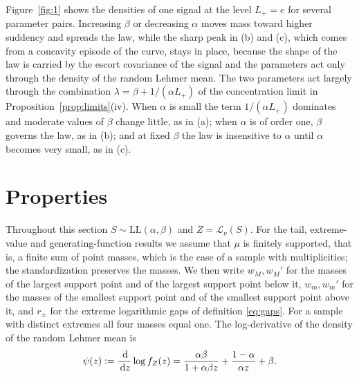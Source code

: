\documentclass[sn-mathphys-num]{sn-jnl}\newcommand{\SNJNL}{}
\theoremstyle{thmstyleone}
\theoremstyle{thmstyletwo}
\theoremstyle{thmstylethree}
\theoremstyle{thmstyleone}
\providecommand{\Leh}{\mathscr{L}}
\providecommand{\dd}{\,\mathrm{d}}
\providecommand{\eqdef}{\mathrel{\vcentcolon=}}
\providecommand{\LL}{\mathrm{LL}}
\begin{document}
	Figure~\ref{fig:1} shows the densities of one signal at the level
	$L_+=e$ for several parameter pairs. Increasing $\beta$ or
	decreasing $\alpha$ moves mass toward higher suddency and spreads
	the law, while the sharp peak in (b) and (c), which comes from a concavity
	episode of the curve, stays in place, because the shape of the
	law is carried by the escort covariance of the signal and the
	parameters act only through the density of the random Lehmer mean.
	The two parameters act largely through the combination
	$\lambda=\beta+1/(\alpha L_+)$ of the concentration limit in
	Proposition~\ref{prop:limits}(iv). When $\alpha$ is small the term
	$1/(\alpha L_+)$ dominates and moderate values of $\beta$ change
	little, as in (a); when $\alpha$ is of order one, $\beta$ governs the
	law, as in (b); and at fixed $\beta$ the law is insensitive to
	$\alpha$ until $\alpha$ becomes very small, as in (c).
	
	\section{Properties}\label{sec:properties}
	
	Throughout this section $S\sim\LL(\alpha,\beta)$ and
	$Z=\Leh_\nu(S)$. For the tail, extreme-value and generating-function results we
	assume that $\mu$ is finitely supported, that is, a finite sum of
	point masses, which is the case of a sample with multiplicities; the
	standardization preserves the masses. We then write $w_M,w_M'$ for
	the masses of the largest support point and of the largest support
	point below it, $w_m,w_m'$ for the masses of the smallest support
	point and of the smallest support point above it, and $r_\pm$ for the
	extreme logarithmic gaps of definition \eqref{eq:gaps}. For a sample
	with distinct extremes all four masses equal one. The
	log-derivative of the density of the random Lehmer mean is
	\begin{equation}\label{eq:psi}
		\psi(z)\eqdef\frac{\dd}{\dd z}\log f_Z(z)
		=\frac{\alpha\beta}{1+\alpha\beta z}+\frac{1-\alpha}{\alpha z}+\beta .
	\end{equation}
	
\end{document}
